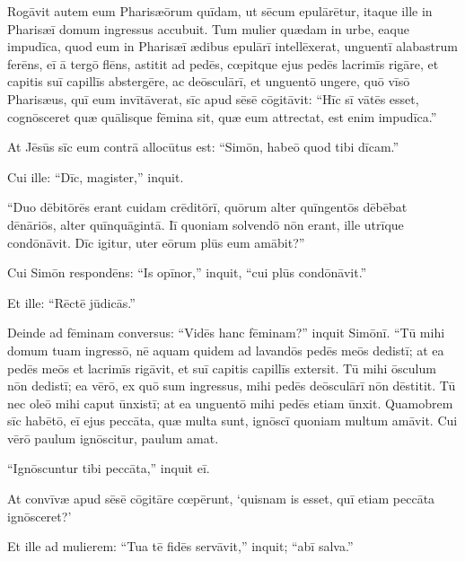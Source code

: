 \Versus Rogāvit autem eum Pharisæōrum quīdam, ut sēcum epulārētur, itaque ille in Pharisæī domum ingressus accubuit.
\Versus Tum mulier quædam in urbe, eaque impudīca, quod eum in Pharisæī ædibus epulārī intellēxerat, unguentī alabastrum ferēns,
\Versus eī ā tergō flēns, astitit ad pedēs, cœpitque ejus pedēs lacrimīs rigāre, et capitis suī capillīs abstergēre, ac deōsculārī, et unguentō ungere,
\Versus quō vīsō Pharisæus, quī eum invītāverat, sīc apud sēsē cōgitāvit: ``Hīc sī vātēs esset, cognōsceret quæ quālisque fēmina sit, quæ eum attrectat, est enim impudīca.''

\Versus At Jēsūs sīc eum contrā allocūtus est: ``Simōn, habeō quod tibi dīcam.''

Cui ille: ``Dīc, magister,'' inquit.


\Versus ``Duo dēbitōrēs erant cuidam crēditōrī, quōrum alter quīngentōs dēbēbat dēnāriōs, alter quīnquāgintā.
\Versus Iī quoniam solvendō nōn erant, ille utrīque condōnāvit. Dīc igitur, uter eōrum plūs eum amābit?''

\Versus Cui Simōn respondēns: ``Is opīnor,'' inquit, ``cui plūs condōnāvit.''

Et ille: ``Rēctē jūdicās.''

\Versus Deinde ad fēminam conversus: ``Vidēs hanc fēminam?'' inquit Simōnī. ``Tū mihi domum tuam ingressō, nē aquam quidem ad lavandōs pedēs meōs dedistī; at ea pedēs meōs et lacrimīs rigāvit, et suī capitis capillīs extersit.
\Versus Tū mihi ōsculum nōn dedistī; ea vērō, ex quō sum ingressus, mihi pedēs deōsculārī nōn dēstitit.
\Versus Tū nec oleō mihi caput ūnxistī; at ea unguentō mihi pedēs etiam ūnxit.
\Versus Quamobrem sīc habētō, eī ejus peccāta, quæ multa sunt, ignōscī quoniam multum amāvit. Cui vērō paulum ignōscitur, paulum amat.

\Versus ``Ignōscuntur tibi peccāta,'' inquit eī.

\Versus At convīvæ apud sēsē cōgitāre cœpērunt, `quisnam is esset, quī etiam peccāta ignōsceret?'

\Versus Et ille ad mulierem: ``Tua tē fidēs servāvit,'' inquit; ``abī salva.''

